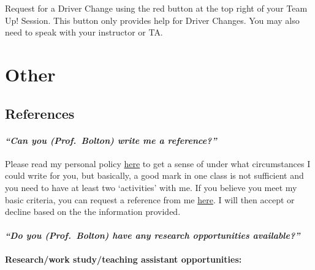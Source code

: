\documentclass[
  openany]{book}
\begin{document}
Request for a Driver Change using the red button at the top right of your Team Up! Session. This button only provides help for Driver Changes. You may also need to speak with your instructor or TA.

\hypertarget{other}{%
\section{Other}\label{other}}

\hypertarget{references-1}{%
\subsection{References}\label{references-1}}

\hypertarget{can-you-prof.-bolton-write-me-a-reference}{%
\paragraph{\texorpdfstring{\emph{``Can you (Prof.~Bolton) write me a reference?''}}{``Can you (Prof.~Bolton) write me a reference?''}}\label{can-you-prof.-bolton-write-me-a-reference}}

Please read my personal policy \href{https://www.lizabolton.com/references.html}{here} to get a sense of under what circumstances I could write for you, but basically, a good mark in one class is not sufficient and you need to have at least two `activities' with me. {If you believe you meet my basic criteria, you can request a reference from me \href{https://forms.office.com/r/XHqjGXjCru}{here}.} I will then accept or decline based on the the information provided.

\hypertarget{do-you-prof.-bolton-have-any-research-opportunities-available}{%
\paragraph{\texorpdfstring{\emph{``Do you (Prof.~Bolton) have any research opportunities available?''}}{``Do you (Prof.~Bolton) have any research opportunities available?''}}\label{do-you-prof.-bolton-have-any-research-opportunities-available}}

\textbf{Research/work study/teaching assistant opportunities:}
\end{document}
